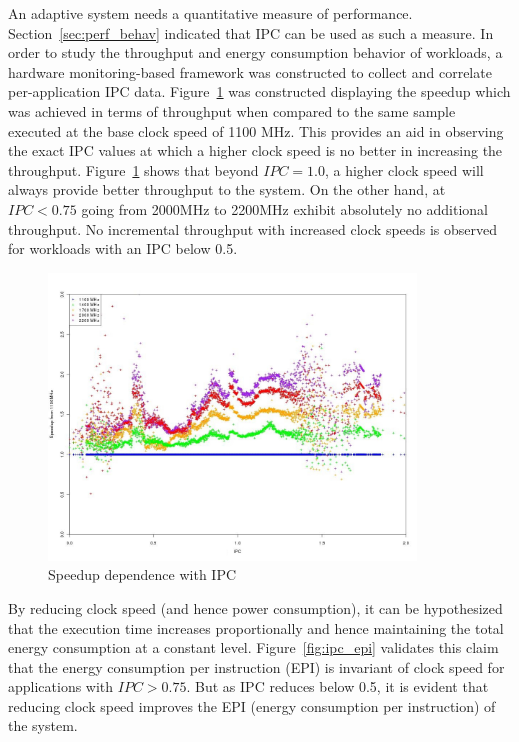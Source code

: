 An adaptive system needs a quantitative measure of performance. Section~\ref{sec:perf_behav} indicated
that IPC can be used as such a measure. In order to study the throughput and energy consumption behavior of
workloads, a hardware monitoring-based framework was constructed to
collect and correlate per-application IPC data. Figure~\ref{fig:ipc_speedup} 
was constructed displaying the speedup which was achieved in terms of throughput when compared to the same 
sample executed at the base clock speed of 1100 MHz. This provides an aid in observing the exact IPC
values at which a higher clock speed is no better in increasing the throughput. Figure~\ref{fig:ipc_speedup}
shows that beyond $IPC = 1.0$, a higher clock speed will always provide better throughput to the system. On the
other hand, at $IPC < 0.75$ going from 2000MHz to 2200MHz exhibit absolutely no additional throughput.
No incremental throughput with increased clock speeds is observed for workloads with an IPC below 0.5.
\begin{figure}[h!]
  \begin{center}
    \includegraphics[height=3in]{figures/ipc_speedup.jpg}
    \caption{Speedup dependence with IPC}
    \label{fig:ipc_speedup}
  \end{center}
\end{figure}

By reducing clock speed (and hence power consumption), it can be hypothesized that the execution time
increases proportionally and hence maintaining the total energy consumption at a constant level.
Figure~\ref{fig:ipc_epi} validates this claim that 
the energy consumption per instruction (EPI) is invariant of clock speed for applications with $IPC > 0.75$. 
But as IPC reduces below 0.5, it is evident that reducing clock speed improves the EPI 
(energy consumption per instruction) of the system.


